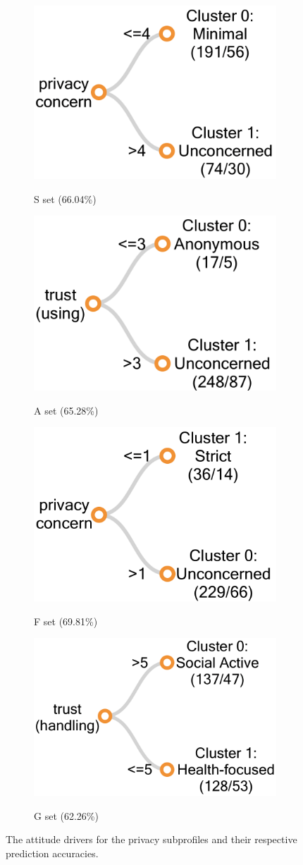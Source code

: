 \begin{figure}
	\centering
	\begin{subfigure}[b]{0.4\linewidth}
		\includegraphics[width=0.5\linewidth]{figures/s_tree2new.png}
		\label{fig:stree2}
		\caption{S set (66.04\%)}
	\end{subfigure}
	\begin{subfigure}[b]{0.4\linewidth}  
		\includegraphics[width=0.5\linewidth]{figures/a_tree2new.png}
		\label{fig:atree2}
		\caption{A set (65.28\%)}
	\end{subfigure}
	\begin{subfigure}[b]{0.4\linewidth} 
		\includegraphics[width=0.5\linewidth]{figures/f_tree2new.png}
		\label{fig:ftree2}
		\caption{F set (69.81\%)}
	\end{subfigure} 
	\begin{subfigure}[b]{0.4\linewidth} 
		\includegraphics[width=0.5\linewidth]{figures/g_tree2new.png}
		\label{fig:gtree2}
		\caption{G set (62.26\%)}
	\end{subfigure}
	\caption{The attitude drivers for the privacy subprofiles and their respective prediction accuracies.}
	\label{fig:tree2}
\end{figure} 



